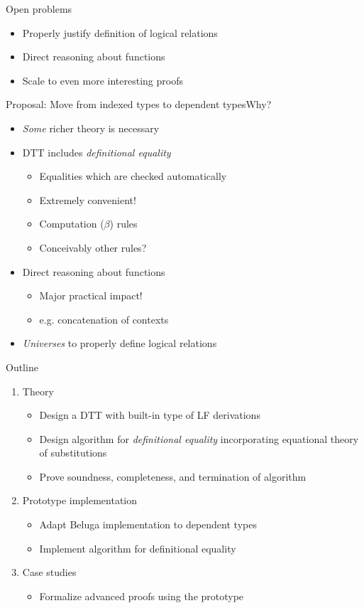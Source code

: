 \documentclass[usenames,dvipsnames]{beamer}
\begin{document}
\begin{frame}{Open problems}
\begin{itemize}
\item Properly justify definition of logical relations
\item Direct reasoning about functions
\item Scale to even more interesting proofs
\end{itemize}
\end{frame}

\begin{frame}{Proposal: Move from indexed types to dependent types}{Why?}
\begin{itemize}
\item \emph{Some} richer theory is necessary
\item DTT includes \emph{definitional equality}
\begin{itemize}
\item Equalities which are checked automatically
\item Extremely convenient!
\item Computation ($\beta$) rules
\item Conceivably other rules?
\end{itemize}
\item Direct reasoning about functions
\begin{itemize}
\item Major practical impact!
\item e.g. concatenation of contexts
\end{itemize}
\item \emph{Universes} to properly define logical relations
\end{itemize}
\end{frame}

\begin{frame}{Outline}
\begin{enumerate}
\item Theory
\begin{itemize}
\item Design a DTT with built-in type of LF derivations
\item Design algorithm for \emph{definitional equality} incorporating equational theory of substitutions
\item Prove soundness, completeness, and termination of algorithm
\end{itemize}
\item Prototype implementation
\begin{itemize}
\item Adapt Beluga implementation to dependent types
\item Implement algorithm for definitional equality
\end{itemize}
\item Case studies
\begin{itemize}
\item Formalize advanced proofs using the prototype
\end{itemize}
\end{enumerate}
\end{frame}
\end{document}

